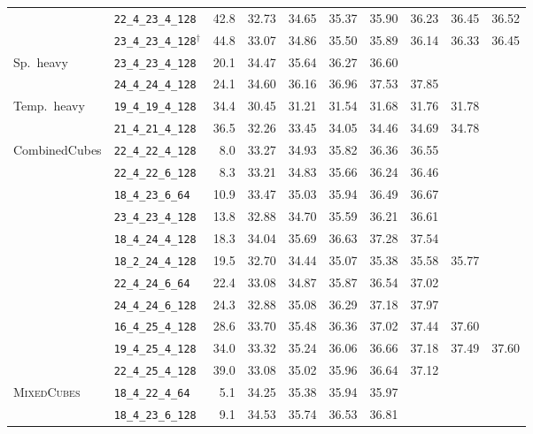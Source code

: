 \documentclass[12pt, a4paper, twoside]{report}
\newcommand{\MixedCubes}{\textsc{MixedCubes}}
\begin{document}
\begin{table}[htbp]
\begin{adjustwidth}{-3cm}{-1cm}
\begin{tabular}{llrrrrrrrr}
   & \texttt{22\_4\_23\_4\_128} & 42.8 & 32.73 & 34.65 & 35.37 & 35.90 & 36.23 & 36.45 & 36.52 \\
   & \texttt{23\_4\_23\_4\_128}$^\dagger$ & 44.8 & 33.07 & 34.86 & 35.50 & 35.89 & 36.14 & 36.33 & 36.45 \\
\addlinespace
  Sp.~heavy & \texttt{23\_4\_23\_4\_128} & 20.1 & 34.47 & 35.64 & 36.27 & 36.60 &   &   &   \\
   & \texttt{24\_4\_24\_4\_128} & 24.1 & 34.60 & 36.16 & 36.96 & 37.53 & 37.85 &   &   \\
\addlinespace
  Temp.~heavy & \texttt{19\_4\_19\_4\_128} & 34.4 & 30.45 & 31.21 & 31.54 & 31.68 & 31.76 & 31.78 &   \\
   & \texttt{21\_4\_21\_4\_128} & 36.5 & 32.26 & 33.45 & 34.05 & 34.46 & 34.69 & 34.78 &   \\
\addlinespace
  CombinedCubes & \texttt{22\_4\_22\_4\_128} & 8.0 & 33.27 & 34.93 & 35.82 & 36.36 & 36.55 &   &   \\
   & \texttt{22\_4\_22\_6\_128} & 8.3 & 33.21 & 34.83 & 35.66 & 36.24 & 36.46 &   &   \\
   & \texttt{18\_4\_23\_6\_64} & 10.9 & 33.47 & 35.03 & 35.94 & 36.49 & 36.67 &   &   \\
   & \texttt{23\_4\_23\_4\_128} & 13.8 & 32.88 & 34.70 & 35.59 & 36.21 & 36.61 &   &   \\
   & \texttt{18\_4\_24\_4\_128} & 18.3 & 34.04 & 35.69 & 36.63 & 37.28 & 37.54 &   &   \\
   & \texttt{18\_2\_24\_4\_128} & 19.5 & 32.70 & 34.44 & 35.07 & 35.38 & 35.58 & 35.77 &   \\
   & \texttt{22\_4\_24\_6\_64} & 22.4 & 33.08 & 34.87 & 35.87 & 36.54 & 37.02 &   &   \\
   & \texttt{24\_4\_24\_6\_128} & 24.3 & 32.88 & 35.08 & 36.29 & 37.18 & 37.97 &   &   \\
   & \texttt{16\_4\_25\_4\_128} & 28.6 & 33.70 & 35.48 & 36.36 & 37.02 & 37.44 & 37.60 &   \\
   & \texttt{19\_4\_25\_4\_128} & 34.0 & 33.32 & 35.24 & 36.06 & 36.66 & 37.18 & 37.49 & 37.60 \\
   & \texttt{22\_4\_25\_4\_128} & 39.0 & 33.08 & 35.02 & 35.96 & 36.64 & 37.12 &   &   \\
\addlinespace
  \MixedCubes{} & \texttt{18\_4\_22\_4\_64} & 5.1 & 34.25 & 35.38 & 35.94 & 35.97 &   &   &   \\
   & \texttt{18\_4\_23\_6\_128} & 9.1 & 34.53 & 35.74 & 36.53 & 36.81 &   &   &   \\

\end{tabular}
\end{adjustwidth}
\end{table}
\end{document}
